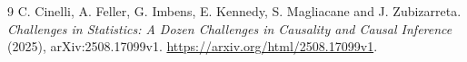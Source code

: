 \documentclass[11pt]{article}
\theoremstyle{definition}
\begin{document}
\begin{thebibliography}{9}
 C. Cinelli, A. Feller, G. Imbens, E. Kennedy, S. Magliacane and J. Zubizarreta.
\emph{Challenges in Statistics: A Dozen Challenges in Causality and Causal Inference} (2025), arXiv:2508.17099v1.
\url{https://arxiv.org/html/2508.17099v1}.
\end{thebibliography}
\end{document}
